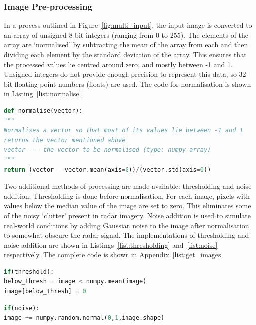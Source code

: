 \subsubsection{Image Pre-processing}

In a process outlined in Figure~\ref{fig:multi_input}, the input image is converted to an array of unsigned 8-bit integers (ranging from 0 to 255). The elements of the array are `normalised' by subtracting the mean of the array from each and then dividing each element by the standard deviation of the array. This ensures that the processed values lie centred around zero, and mostly between -1 and 1. Unsigned integers do not provide enough precision to represent this data, so 32-bit floating point numbers (floats) are used. The code for normalisation is shown in Listing~\ref{list:normalise}.

\begin{lstlisting}[language=Python, caption=Normalisation method, captionpos=b, label={list:normalise}]
def normalise(vector):
"""
Normalises a vector so that most of its values lie between -1 and 1
returns the vector mentioned above
vector --- the vector to be normalised (type: numpy array)
"""
return (vector - vector.mean(axis=0))/(vector.std(axis=0))
\end{lstlisting}

Two additional methods of processing are made available: thresholding and noise addition. Thresholding is done before normalisation. For each image, pixels with values below the median value of the image are set to zero. This eliminates some of the noisy `clutter' present in radar imagery. Noise addition is used to simulate real-world conditions by adding Gaussian noise to the image after normalisation to somewhat obscure the radar signal. The implementations of thresholding and noise addition are shown in Listings~\ref{list:thresholding} and~\ref{list:noise} respectively. The complete code is shown in Appendix~\ref{list:get_images}


\begin{lstlisting}[language=Python, caption=Thresholding, captionpos=b, label={list:thresholding}]
if(threshold):
below_thresh = image < numpy.mean(image)
image[below_thresh] = 0
\end{lstlisting}

\begin{lstlisting}[language=Python, caption=Adding noise to an image, captionpos=b, label={list:noise}]
if(noise):
image += numpy.random.normal(0,1,image.shape)
\end{lstlisting}



